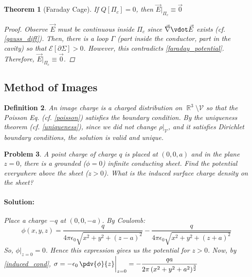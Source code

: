 \documentclass[12pt]{article}
\renewcommand{\div}{\vec{\nabla}\vdot}
\DeclareMathOperator{\R}{\mathbb{R}}
\newcommand*{\vE}{\vec{E}}
\newcommand*{\ee}{\epsilon_0}
\newcommand*{\vol}{\mathcal{V}}
\newtheorem{theorem}{Theorem}[subsection]
\newtheorem{definition}[theorem]{Definition}
\newtheorem{problem}[theorem]{Problem}
\newenvironment{solution}{\paragraph{Solution:}}{\hfill}
\begin{document}
\begin{theorem}[Faraday Cage]
  If $Q[\Pi_c]=0$, then $\vec{E}\big|_{\Pi_c}\equiv\vec{0}$
  \begin{proof}
    Observe $\vec{E}$ must be continuous inside $\Pi_c$ since $\div\vE$ exists (cf. \ref{gauss_diff}). Then, there is a loop $\Gamma$ (part inside the conductor, part in the cavity) so that $\mathcal{E}[\partial\Sigma]>0$. However, this contradicts \ref{faraday_potential}. Therefore, $\vec{E}\big|_{\Pi_c}\equiv\vec{0}$.
  \end{proof}
\end{theorem}

\pagebreak

\subsection{Method of Images}

\begin{definition}
  An image charge is a charged distribution on $\R^3\setminus \vol$ so that the Poisson Eq. (cf. \ref{poisson}) satisfies the boundary condition. By the uniqueness theorem (cf. \ref{uniqueness}), since we did not change $\rho\big|_\vol$, and it satisfies Dirichlet boundary conditions, the solution is valid and unique.
\end{definition}

\begin{problem}
  A point charge of charge $q$ is placed at $(0,0,a)$ and in the plane $z=0$, there is a grounded ($\phi=0$) infinite conducting sheet. Find the potential everywhere above the sheet ($z>0$). What is the induced surface charge density on the sheet?
  \begin{solution}
    Place a charge $-q$ at $(0,0,-a)$. By Coulomb: $$\phi(x,y,z)=\frac{q}{4\pi\ee\sqrt{x^2+y^2+(z-a)^2}}-\frac{q}{4\pi\ee\sqrt{x^2+y^2+(z+a)^2}}$$ So, $\phi\big|_{z=0}=0$. Hence this expression gives us the potential for $z>0$. Now, by \ref{induced_cond}, $\displaystyle\sigma=-\ee\,\pdv{\phi}{z}\bigg|_{z=0}=-  \frac{qa}{2\pi\,(x^2+y^2+a^2)^{3\over 2}}$
  \end{solution}
\end{problem}
\end{document}
